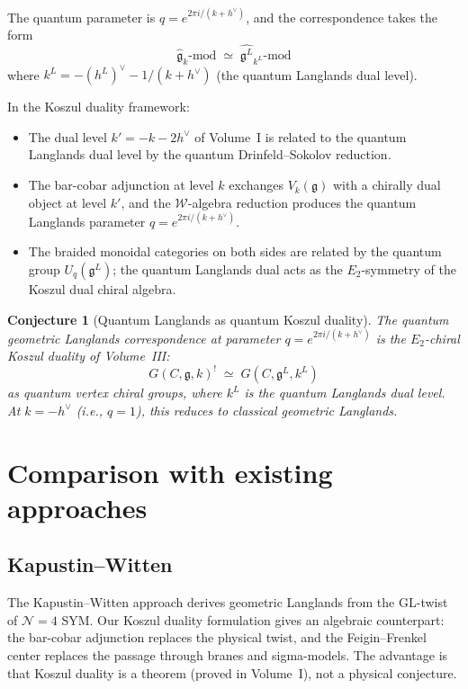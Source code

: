 \documentclass[11pt]{article}
\newtheorem{conjecture}[theorem]{Conjecture}
\theoremstyle{definition}
\theoremstyle{remark}
\newcommand{\g}{\mathfrak{g}}
\newcommand{\gL}{\mathfrak{g}^L}
\newcommand{\hv}{h^\vee}
\begin{document}
The quantum parameter is $q = e^{2\pi i / (k + \hv)}$, and the correspondence
takes the form
\[
 \hat{\g}_k\text{-mod}
 \;\simeq\;
 \hat{\gL}_{k^L}\text{-mod}
\]
where $k^L = -(h^L)^\vee - 1/(k + \hv)$ (the quantum Langlands dual level).

In the Koszul duality framework:
\begin{itemize}
 \item The dual level $k' = -k - 2\hv$ of Volume~I is related to the quantum
 Langlands dual level by the quantum Drinfeld--Sokolov reduction.
 \item The bar-cobar adjunction at level $k$ exchanges $V_k(\g)$ with a
 chirally dual object at level $k'$, and the $\mathcal{W}$-algebra reduction
 produces the quantum Langlands parameter $q = e^{2\pi i/(k+\hv)}$.
 \item The braided monoidal categories on both sides are related by the
 quantum group $U_q(\gL)$; the quantum Langlands dual acts as the
 $E_2$-symmetry of the Koszul dual chiral algebra.
\end{itemize}

\begin{conjecture}[Quantum Langlands as quantum Koszul duality]
\label{conj:quantum-langlands-koszul}
The quantum geometric Langlands correspondence at parameter
$q = e^{2\pi i/(k + \hv)}$ is the $E_2$-chiral Koszul duality of
Volume~III:
\[
 G(C,\g,k)^! \;\simeq\; G(C,\gL, k^L)
\]
as quantum vertex chiral groups, where $k^L$ is the quantum Langlands dual
level. At $k = -\hv$ (i.e., $q = 1$), this reduces to classical geometric
Langlands.
\end{conjecture}


\section{Comparison with existing approaches}
\label{sec:comparison}

\subsection{Kapustin--Witten}
The Kapustin--Witten approach derives geometric Langlands from the GL-twist of
$\mathcal{N}=4$ SYM. Our Koszul duality formulation gives an algebraic
counterpart: the bar-cobar adjunction replaces the physical twist, and the
Feigin--Frenkel center replaces the passage through branes and sigma-models.
The advantage is that Koszul duality is a theorem (proved in Volume~I), not a
physical conjecture.
\end{document}
